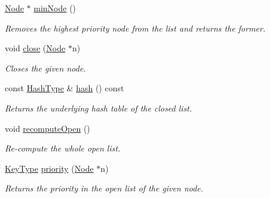 \begin{DoxyCompactItemize}
\hyperlink{structslb_1_1core_1_1sb_1_1OpenClosedList_ab4cf0f882c69f162e0eccf4abe5ad27e}{Node} $\ast$ \hyperlink{structslb_1_1core_1_1sb_1_1OpenClosedList_a543ef6587ac63c5113fede3932160246}{min\+Node} ()
\begin{DoxyCompactList}\small\item\em Removes the highest priority node from the list and returns the former. \end{DoxyCompactList}\item 
void \hyperlink{structslb_1_1core_1_1sb_1_1OpenClosedList_a08a0a94c44a15c6f9de337b3103bc9b8}{close} (\hyperlink{structslb_1_1core_1_1sb_1_1OpenClosedList_ab4cf0f882c69f162e0eccf4abe5ad27e}{Node} $\ast$n)
\begin{DoxyCompactList}\small\item\em Closes the given node. \end{DoxyCompactList}\item 
const \hyperlink{structslb_1_1core_1_1sb_1_1OpenClosedList_a32a2b03f9f64969e70977f9b5f858b3f}{Hash\+Type} \& \hyperlink{structslb_1_1core_1_1sb_1_1OpenClosedList_a02b31f1b0ce5feea1dc45c00e37d1ebd}{hash} () const 
\begin{DoxyCompactList}\small\item\em Returns the underlying hash table of the closed list. \end{DoxyCompactList}\item 
void \hyperlink{structslb_1_1core_1_1sb_1_1OpenClosedList_a4893b96926c3ef275852f532871d19ec}{recompute\+Open} ()\hypertarget{structslb_1_1core_1_1sb_1_1OpenClosedList_a4893b96926c3ef275852f532871d19ec}{}\label{structslb_1_1core_1_1sb_1_1OpenClosedList_a4893b96926c3ef275852f532871d19ec}

\begin{DoxyCompactList}\small\item\em Re-\/compute the whole open list. \end{DoxyCompactList}\item 
\hyperlink{structslb_1_1core_1_1sb_1_1OpenClosedList_a9ffd5756297080af110c9d55b588a34e}{Key\+Type} \hyperlink{structslb_1_1core_1_1sb_1_1OpenClosedList_aa56f6d93b10b1acd3ee9e3a25e73f581}{priority} (\hyperlink{structslb_1_1core_1_1sb_1_1OpenClosedList_ab4cf0f882c69f162e0eccf4abe5ad27e}{Node} $\ast$n)
\begin{DoxyCompactList}\small\item\em Returns the priority in the open list of the given node. \end{DoxyCompactList}\end{DoxyCompactItemize}
